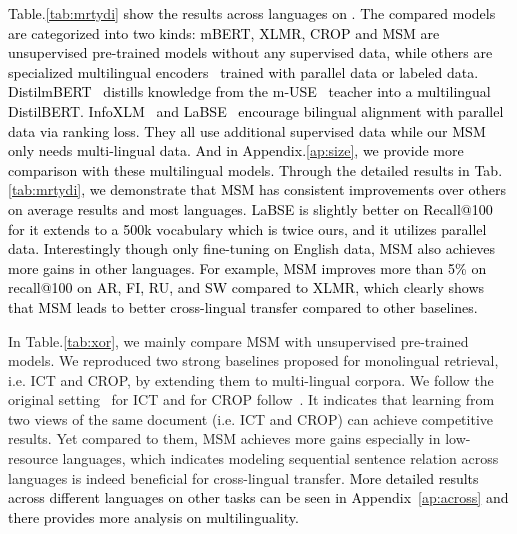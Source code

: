 \textcolor{black}{
Table.\ref{tab:mrtydi} show the results across languages on \tydi. 
The compared models are categorized into two kinds: mBERT, XLMR, CROP and MSM are unsupervised pre-trained models without any supervised data, while others are specialized multilingual encoders~\citep{litschko2021evaluating} trained with parallel data or labeled data. DistilmBERT~\citep{reimers-gurevych-2020-making} distills knowledge from the m-USE~\citep{yang2019multilingual} teacher into a multilingual DistilBERT. InfoXLM~\citep{chi-etal-2021-infoxlm} and LaBSE~\citep{feng-etal-2022-language} encourage bilingual alignment with parallel data via ranking loss. They all use additional supervised data while our MSM only needs multi-lingual data. And in Appendix.\ref{ap:size}, we provide more comparison with these multilingual models. 
Through the detailed results in Tab.\ref{tab:mrtydi}, we demonstrate that MSM has consistent improvements over others on average results and most languages. LaBSE is slightly better on Recall@100 for it extends to a 500k vocabulary which is twice ours, and it utilizes parallel data. Interestingly though only fine-tuning on English data, MSM also achieves more gains in other languages. For example, MSM improves more than 5\% on recall@100 on AR, FI, RU, and SW compared to XLMR, which clearly shows that MSM leads to better cross-lingual transfer compared to other baselines. 
}

In Table.\ref{tab:xor}, we mainly compare MSM with unsupervised pre-trained models. We reproduced two strong baselines proposed for monolingual retrieval, i.e. ICT and CROP, by extending them to multi-lingual corpora. We follow the original setting~\citep{lee-etal-2019-latent} for ICT and for CROP follow~\citet{wu2022unsupervised}. It indicates that learning from two views of the same document (i.e. ICT and CROP) can achieve competitive results. Yet compared to them, MSM achieves more gains especially in low-resource languages, which indicates modeling sequential sentence relation across languages is indeed beneficial for cross-lingual 
transfer.
\textcolor{black}{More detailed results across different languages on other tasks can be seen in Appendix~\ref{ap:across} and there provides more analysis on multilinguality.}





